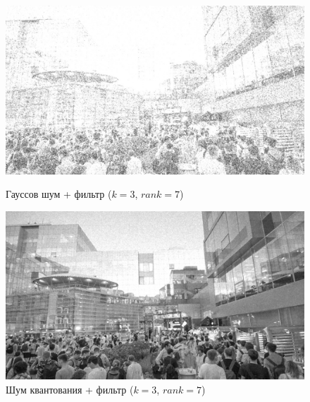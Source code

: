 \documentclass[a4paper]{article}
\begin{document}
\begin{figure}[H]
    \begin{minipage}{0.49\textwidth}
        \centering \includegraphics[width=\textwidth]{images/3_nonlinear_filters/gaussian - rang (k=3, rank=7).jpg}
        \caption{Гауссов шум + фильтр ($k = 3$, $rank = 7$)}
    \end{minipage}\hfill
    \begin{minipage}{0.49\textwidth}
        \centering \includegraphics[width=\textwidth]{images/3_nonlinear_filters/poisson - rang (k=3, rank=7).jpg}
        \caption{Шум квантования + фильтр ($k = 3$, $rank = 7$)}
    \end{minipage}
\end{figure}
\end{document}
